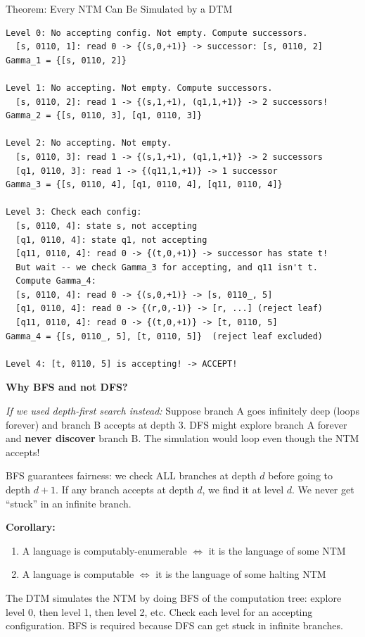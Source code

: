 \documentclass[11pt,a4paper]{article}
\newcommand{\kt}[1]{\par\vspace{0.3em}\colorbox{yellow!60}{\parbox{\dimexpr\linewidth-2\fboxsep}{#1}}\vspace{0.3em}}
\begin{document}
\begin{definitionbox}{{Theorem: Every NTM Can Be Simulated by a DTM}}
\begin{lstlisting}
Level 0: No accepting config. Not empty. Compute successors.
  [s, 0110, 1]: read 0 -> {(s,0,+1)} -> successor: [s, 0110, 2]
Gamma_1 = {[s, 0110, 2]}

Level 1: No accepting. Not empty. Compute successors.
  [s, 0110, 2]: read 1 -> {(s,1,+1), (q1,1,+1)} -> 2 successors!
Gamma_2 = {[s, 0110, 3], [q1, 0110, 3]}

Level 2: No accepting. Not empty.
  [s, 0110, 3]: read 1 -> {(s,1,+1), (q1,1,+1)} -> 2 successors
  [q1, 0110, 3]: read 1 -> {(q11,1,+1)} -> 1 successor
Gamma_3 = {[s, 0110, 4], [q1, 0110, 4], [q11, 0110, 4]}

Level 3: Check each config:
  [s, 0110, 4]: state s, not accepting
  [q1, 0110, 4]: state q1, not accepting
  [q11, 0110, 4]: read 0 -> {(t,0,+1)} -> successor has state t!
  But wait -- we check Gamma_3 for accepting, and q11 isn't t.
  Compute Gamma_4:
  [s, 0110, 4]: read 0 -> {(s,0,+1)} -> [s, 0110_, 5]
  [q1, 0110, 4]: read 0 -> {(r,0,-1)} -> [r, ...] (reject leaf)
  [q11, 0110, 4]: read 0 -> {(t,0,+1)} -> [t, 0110, 5]
Gamma_4 = {[s, 0110_, 5], [t, 0110, 5]}  (reject leaf excluded)

Level 4: [t, 0110, 5] is accepting! -> ACCEPT!
\end{lstlisting}

\textbf{Why BFS and not DFS?}

\textit{If we used depth-first search instead:} Suppose branch A goes infinitely deep (loops forever) and branch B accepts at depth 3. DFS might explore branch A forever and \textbf{never discover} branch B. The simulation would loop even though the NTM accepts!

BFS guarantees fairness: we check ALL branches at depth $d$ before going to depth $d+1$. If any branch accepts at depth $d$, we find it at level $d$. We never get ``stuck'' in an infinite branch.

\textbf{Corollary:}
\begin{enumerate}[nosep]
\item A language is computably-enumerable $\Leftrightarrow$ it is the language of some NTM
\item A language is computable $\Leftrightarrow$ it is the language of some halting NTM
\end{enumerate}

\kt{The DTM simulates the NTM by doing BFS of the computation tree: explore level 0, then level 1, then level 2, etc. Check each level for an accepting configuration. BFS is required because DFS can get stuck in infinite branches.}
\end{definitionbox}
\end{document}
